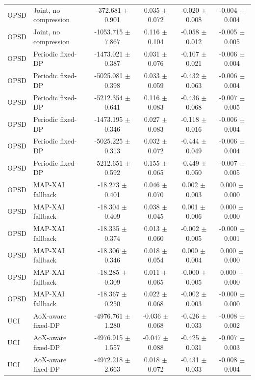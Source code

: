 \begin{tabular}{llcccc}
OPSD & Joint, no compression & -372.681 $\pm$ 0.901 & 0.035 $\pm$ 0.072 & -0.020 $\pm$ 0.008 & -0.004 $\pm$ 0.004 \\
OPSD & Joint, no compression & -1053.715 $\pm$ 7.867 & 0.116 $\pm$ 0.104 & -0.058 $\pm$ 0.012 & -0.005 $\pm$ 0.005 \\
OPSD & Periodic fixed-DP & -1473.021 $\pm$ 0.387 & 0.031 $\pm$ 0.076 & -0.107 $\pm$ 0.021 & -0.006 $\pm$ 0.004 \\
OPSD & Periodic fixed-DP & -5025.081 $\pm$ 0.398 & 0.033 $\pm$ 0.059 & -0.432 $\pm$ 0.063 & -0.006 $\pm$ 0.004 \\
OPSD & Periodic fixed-DP & -5212.354 $\pm$ 0.641 & 0.116 $\pm$ 0.083 & -0.436 $\pm$ 0.068 & -0.007 $\pm$ 0.005 \\
OPSD & Periodic fixed-DP & -1473.195 $\pm$ 0.346 & 0.027 $\pm$ 0.083 & -0.118 $\pm$ 0.016 & -0.006 $\pm$ 0.004 \\
OPSD & Periodic fixed-DP & -5025.225 $\pm$ 0.313 & 0.032 $\pm$ 0.072 & -0.444 $\pm$ 0.049 & -0.006 $\pm$ 0.004 \\
OPSD & Periodic fixed-DP & -5212.651 $\pm$ 0.592 & 0.155 $\pm$ 0.065 & -0.449 $\pm$ 0.050 & -0.007 $\pm$ 0.005 \\
OPSD & MAP-XAI fallback & -18.273 $\pm$ 0.401 & 0.046 $\pm$ 0.070 & 0.002 $\pm$ 0.003 & 0.000 $\pm$ 0.000 \\
OPSD & MAP-XAI fallback & -18.304 $\pm$ 0.409 & 0.038 $\pm$ 0.045 & 0.001 $\pm$ 0.006 & 0.000 $\pm$ 0.000 \\
OPSD & MAP-XAI fallback & -18.335 $\pm$ 0.374 & 0.013 $\pm$ 0.060 & -0.002 $\pm$ 0.005 & -0.000 $\pm$ 0.001 \\
OPSD & MAP-XAI fallback & -18.306 $\pm$ 0.346 & 0.018 $\pm$ 0.054 & 0.000 $\pm$ 0.004 & 0.000 $\pm$ 0.000 \\
OPSD & MAP-XAI fallback & -18.285 $\pm$ 0.309 & 0.011 $\pm$ 0.065 & -0.000 $\pm$ 0.005 & 0.000 $\pm$ 0.000 \\
OPSD & MAP-XAI fallback & -18.367 $\pm$ 0.250 & 0.022 $\pm$ 0.068 & -0.002 $\pm$ 0.003 & -0.000 $\pm$ 0.000 \\
UCI & AoX-aware fixed-DP & -4976.761 $\pm$ 1.280 & -0.036 $\pm$ 0.068 & -0.426 $\pm$ 0.033 & -0.008 $\pm$ 0.002 \\
UCI & AoX-aware fixed-DP & -4976.915 $\pm$ 1.557 & -0.047 $\pm$ 0.088 & -0.425 $\pm$ 0.031 & -0.007 $\pm$ 0.003 \\
UCI & AoX-aware fixed-DP & -4972.218 $\pm$ 2.663 & 0.018 $\pm$ 0.072 & -0.431 $\pm$ 0.033 & -0.008 $\pm$ 0.004 \\

\end{tabular}

